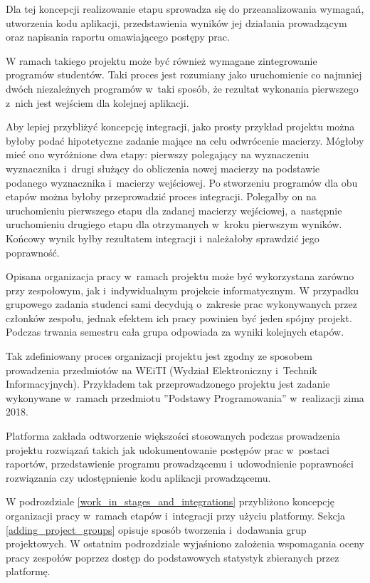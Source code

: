 Dla tej koncepcji realizowanie etapu sprowadza się do przeanalizowania wymagań, utworzenia kodu aplikacji, przedstawienia wyników jej działania prowadzącym oraz napisania raportu omawiającego postępy prac.

W ramach takiego projektu może być również wymagane zintegrowanie programów studentów.
Taki proces jest rozumiany jako uruchomienie co najmniej dwóch niezależnych programów w~taki sposób, że rezultat wykonania pierwszego z~nich jest wejściem dla kolejnej aplikacji.

Aby lepiej przybliżyć koncepcję integracji, jako prosty przykład projektu można byłoby podać hipotetyczne zadanie mające na celu odwrócenie macierzy.
Mógłoby mieć ono wyróżnione dwa etapy: pierwszy polegający na wyznaczeniu wyznacznika i~drugi służący do obliczenia nowej macierzy na podstawie podanego wyznacznika i~macierzy wejściowej.
Po stworzeniu programów dla obu etapów można byłoby przeprowadzić proces integracji.
Polegałby on na uruchomieniu pierwszego etapu dla zadanej macierzy wejściowej, a~następnie uruchomieniu drugiego etapu dla otrzymanych w~kroku pierwszym wyników.
Końcowy wynik byłby rezultatem integracji i~należałoby sprawdzić jego poprawność.

Opisana organizacja pracy w~ramach projektu może być wykorzystana zarówno przy zespołowym, jak i~indywidualnym projekcie informatycznym.
W przypadku grupowego zadania studenci sami decydują o~zakresie prac wykonywanych przez członków zespołu, jednak efektem ich pracy powinien być jeden spójny projekt.
Podczas trwania semestru cała grupa odpowiada za wyniki kolejnych etapów.

Tak zdefiniowany proces organizacji projektu jest zgodny ze sposobem prowadzenia przedmiotów na WEiTI (Wydział Elektroniczny i~Technik Informacyjnych).
Przykładem tak przeprowadzonego projektu jest zadanie wykonywane w~ramach przedmiotu ”Podstawy Programowania” w~realizacji zima 2018.

Platforma zakłada odtworzenie większości stosowanych podczas prowadzenia projektu rozwiązań takich jak udokumentowanie postępów prac w~postaci raportów, przedstawienie programu prowadzącemu i~udowodnienie poprawności rozwiązania czy udostępnienie kodu aplikacji prowadzącemu.

W podrozdziale \ref{work_in_stages_and_integrations} przybliżono koncepcję organizacji pracy w~ramach etapów i~integracji przy użyciu platformy.
Sekcja \ref{adding_project_groups} opisuje sposób tworzenia i~dodawania grup projektowych.
W ostatnim podrozdziale wyjaśniono założenia wspomagania oceny pracy zespołów poprzez dostęp do podstawowych statystyk zbieranych przez platformę.


